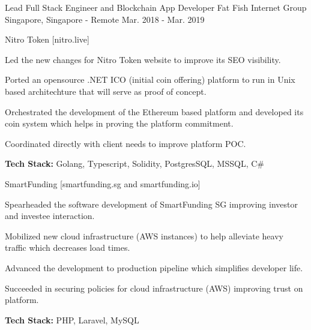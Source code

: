 \begin{cventries}
    \cventry
        {Lead Full Stack Engineer and Blockchain App Developer}
        {Fat Fish Internet Group}
        {Singapore, Singapore - Remote}
        {Mar. 2018 - Mar. 2019}
        {
            \begin{cvitems}
                \item
                    {Nitro Token [nitro.live]}
                \begin{cvsubitems}
                    \item 
                        {Led the new changes for Nitro Token website to improve its SEO visibility.}
                    \item 
                        {Ported an opensource .NET ICO (initial coin offering) platform to run in Unix based architechture that will serve as proof of concept.}
                    \item
                        {Orchestrated the development of the Ethereum based platform and developed its coin system which helps in proving the platform commitment.}
                    \item 
                        {Coordinated directly with client needs to improve platform POC.}
                    \item 
                        {\textbf{Tech Stack:} Golang, Typescript, Solidity, PostgresSQL, MSSQL, C\#}
                \end{cvsubitems}
                \item
                    {SmartFunding [smartfunding.sg and smartfunding.io]}
                \begin{cvsubitems}
                    \item 
                        {Spearheaded the software development of SmartFunding SG improving investor and investee interaction.}
                    \item
                        {Mobilized new cloud infrastructure (AWS instances) to help alleviate heavy traffic which decreases load times.}
                    \item
                        {Advanced the development to production pipeline which simplifies developer life.}
                    \item 
                        {Succeeded in securing policies for cloud infrastructure (AWS) improving trust on platform.}
                    \item 
                        {\textbf{Tech Stack:} PHP, Laravel, MySQL}
                \end{cvsubitems}

\end{cvitems}}
\end{cventries}

